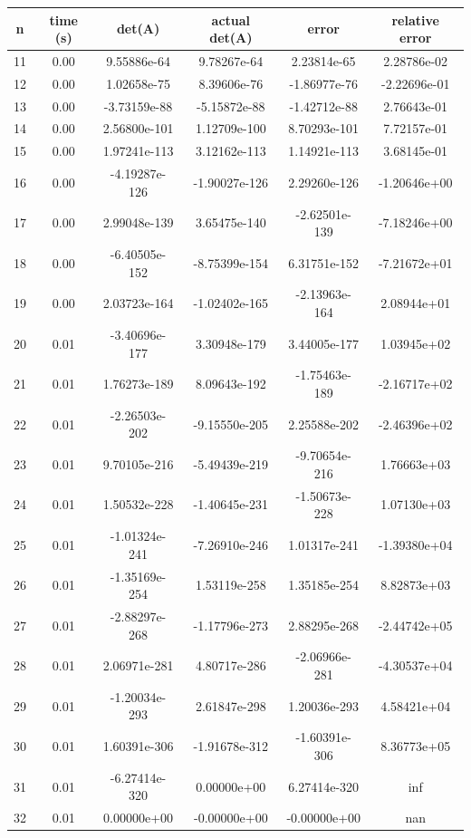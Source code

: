 \documentclass[12pt]{article}
\begin{document}
\begin{tabular}{ c | c | c | c | c | c }
n & time (s) & det(A) & actual det(A) & error & relative error \\
\hline
11 & 0.00 & 9.55886e-64 & 9.78267e-64 & 2.23814e-65 & 2.28786e-02 \\
12 & 0.00 & 1.02658e-75 & 8.39606e-76 & -1.86977e-76 & -2.22696e-01 \\
13 & 0.00 & -3.73159e-88 & -5.15872e-88 & -1.42712e-88 & 2.76643e-01 \\
14 & 0.00 & 2.56800e-101 & 1.12709e-100 & 8.70293e-101 & 7.72157e-01 \\
15 & 0.00 & 1.97241e-113 & 3.12162e-113 & 1.14921e-113 & 3.68145e-01 \\
16 & 0.00 & -4.19287e-126 & -1.90027e-126 & 2.29260e-126 & -1.20646e+00 \\
17 & 0.00 & 2.99048e-139 & 3.65475e-140 & -2.62501e-139 & -7.18246e+00 \\
18 & 0.00 & -6.40505e-152 & -8.75399e-154 & 6.31751e-152 & -7.21672e+01 \\
19 & 0.00 & 2.03723e-164 & -1.02402e-165 & -2.13963e-164 & 2.08944e+01 \\
20 & 0.01 & -3.40696e-177 & 3.30948e-179 & 3.44005e-177 & 1.03945e+02 \\
21 & 0.01 & 1.76273e-189 & 8.09643e-192 & -1.75463e-189 & -2.16717e+02 \\
22 & 0.01 & -2.26503e-202 & -9.15550e-205 & 2.25588e-202 & -2.46396e+02 \\
23 & 0.01 & 9.70105e-216 & -5.49439e-219 & -9.70654e-216 & 1.76663e+03 \\
24 & 0.01 & 1.50532e-228 & -1.40645e-231 & -1.50673e-228 & 1.07130e+03 \\
25 & 0.01 & -1.01324e-241 & -7.26910e-246 & 1.01317e-241 & -1.39380e+04 \\
26 & 0.01 & -1.35169e-254 & 1.53119e-258 & 1.35185e-254 & 8.82873e+03 \\
27 & 0.01 & -2.88297e-268 & -1.17796e-273 & 2.88295e-268 & -2.44742e+05 \\
28 & 0.01 & 2.06971e-281 & 4.80717e-286 & -2.06966e-281 & -4.30537e+04 \\
29 & 0.01 & -1.20034e-293 & 2.61847e-298 & 1.20036e-293 & 4.58421e+04 \\
30 & 0.01 & 1.60391e-306 & -1.91678e-312 & -1.60391e-306 & 8.36773e+05 \\
31 & 0.01 & -6.27414e-320 & 0.00000e+00 & 6.27414e-320 & inf \\
32 & 0.01 & 0.00000e+00 & -0.00000e+00 & -0.00000e+00 & nan \\

\end{tabular}
\end{document}
